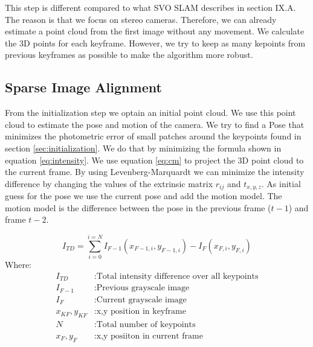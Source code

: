 \documentclass[11pt,a4paper,titlepage,oneside]{report}
\begin{document}
This step is different compared to what SVO SLAM describes in \cite{svo2} section IX.A. The reason is that we focus on stereo cameras. Therefore, we can already estimate a point cloud from the first image without any movement. We calculate the 3D points for each keyframe. However, we try to keep as many kepoints from previous keyframes as possible to make the algorithm more robust.

\subsection{Sparse Image Alignment}\label{sec:sia}

From the initialization step we optain an initial point cloud. We use this point cloud to estimate the pose and motion of the camera. We try to find a Pose that minimizes the photometric error of small patches around the keypoints found in section \ref{sec:initialization}. We do that by minimizing the formula shown in equation \ref{eq:intensity}. We use equation \ref{eq:cm} to project the 3D point cloud to the current frame. By using Levenberg-Marquardt we can minimize the intensity difference by changing the values of the extrinsic matrix $r_{ij}$ and $t_{x,y,z}$. As initial guess for the pose we use the current pose and add the motion model. The motion model is the difference between the pose in the previous frame ($t-1$) and frame $t-2$.

\begin{equation}\label{eq:intensity}
	I_{TD}=\sum_{i=0}^{i=N}I_{F-1}(x_{F-1,i},y_{F-1,i})-I_{F}(x_{F,i},y_{F,i})
\end{equation}
Where:
\begin{align*}
	I_{TD} &:					\text{Total intensity difference over all keypoints}\\
	I_{F-1} &:				\text{Previous grayscale image}\\
	I_{F} &:					\text{Current grayscale image}\\
	x_{KF},y_{KF} &:	\text{x,y position in keyframe}\\
	N &:							\text{Total number of keypoints}\\
	x_{F},y_{F} &:		\text{x,y posiiton in current frame}
\end{align*}
\end{document}

